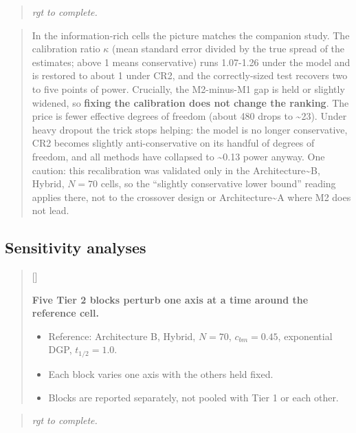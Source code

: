\documentclass[
  11pt,
]{article}
\newcounter{pgraph}
\newenvironment{bullets}{%
  \stepcounter{pgraph}%
  \begin{quote}\small\sffamily\color[gray]{0.30}%
  {\normalfont\scriptsize\color[gray]{0.58}[\thepgraph]\enspace}}{%
  \end{quote}}
\newenvironment{rgt}{%
  \begin{quote}\small\itshape\color[RGB]{20,60,160}}{%
  \end{quote}}
\newenvironment{orig}{%
  \begin{quote}\normalsize\color[gray]{0.55}}{%
  \end{quote}}
\begin{document}
\begin{rgt}
rgt to complete.

\end{rgt}

\begin{orig}
In the information-rich cells the picture matches the companion
study. The calibration ratio \(\kappa\) (mean standard error divided
by the true spread of the estimates; above 1 means conservative)
runs 1.07-1.26 under the model and is restored to about 1 under
CR2, and the correctly-sized test recovers two to five points of
power. Crucially, the M2-minus-M1 gap is held or slightly widened,
so \textbf{fixing the calibration does not change the ranking}. The
price is fewer effective degrees of freedom (about 480 drops to
\textasciitilde23). Under heavy dropout the trick stops helping: the model is no
longer conservative, CR2 becomes slightly anti-conservative on its
handful of degrees of freedom, and all methods have collapsed to
\textasciitilde0.13 power anyway. One caution: this recalibration was validated
only in the Architecture\textasciitilde B, Hybrid, \(N = 70\) cells, so the
``slightly conservative lower bound'' reading applies there, not to
the crossover design or Architecture\textasciitilde A where M2 does not lead.

\end{orig}

\subsection{Sensitivity analyses}\label{sensitivity-analyses}

\begin{bullets}

\textbf{Five Tier 2 blocks perturb one axis at a time around the
reference cell.}

\begin{itemize}\setlength{\itemsep}{2pt}\setlength{\parskip}{0pt}
\item Reference: Architecture B, Hybrid, $N = 70$, $c_{bm} = 0.45$,
exponential DGP, $t_{1/2} = 1.0$.
\item Each block varies one axis with the others held fixed.
\item Blocks are reported separately, not pooled with Tier 1 or each
other.
\end{itemize}

\end{bullets}

\begin{rgt}
rgt to complete.

\end{rgt}
\end{document}
